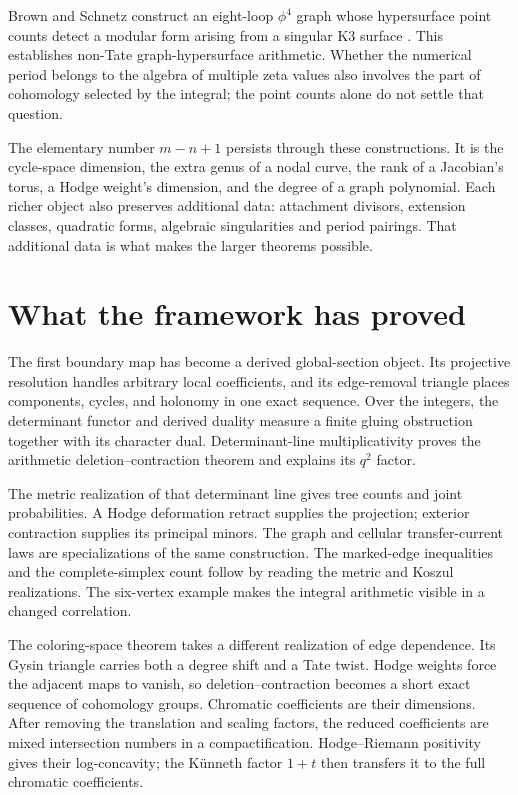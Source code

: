 \documentclass[11pt]{article}
\theoremstyle{definition}
\theoremstyle{remark}
\begin{document}
Brown and Schnetz construct an eight-loop $\phi^4$ graph whose hypersurface point counts detect a modular form arising from a singular K3 surface \cite{BrownSchnetzKThree}. This establishes non-Tate graph-hypersurface arithmetic. Whether the numerical period belongs to the algebra of multiple zeta values also involves the part of cohomology selected by the integral; the point counts alone do not settle that question.

The elementary number $m-n+1$ persists through these constructions.  It
is the cycle-space dimension, the extra genus of a nodal curve, the rank
of a Jacobian's torus, a Hodge weight's dimension, and the degree of a
graph polynomial.  Each richer object also preserves additional data:
attachment divisors, extension classes, quadratic forms, algebraic
singularities and period pairings.  That additional data is what makes
the larger theorems possible.


\section{What the framework has proved}
\label{sec:conclusion}

The first boundary map has become a derived global-section object. Its projective resolution handles arbitrary local coefficients, and its edge-removal triangle places components, cycles, and holonomy in one exact sequence. Over the integers, the determinant functor and derived duality measure a finite gluing obstruction together with its character dual. Determinant-line multiplicativity proves the arithmetic deletion--contraction theorem and explains its $q^2$ factor.

The metric realization of that determinant line gives tree counts and joint probabilities. A Hodge deformation retract supplies the projection; exterior contraction supplies its principal minors. The graph and cellular transfer-current laws are specializations of the same construction. The marked-edge inequalities and the complete-simplex count follow by reading the metric and Koszul realizations. The six-vertex example makes the integral arithmetic visible in a changed correlation.

The coloring-space theorem takes a different realization of edge dependence. Its Gysin triangle carries both a degree shift and a Tate twist. Hodge weights force the adjacent maps to vanish, so deletion--contraction becomes a short exact sequence of cohomology groups. Chromatic coefficients are their dimensions. After removing the translation and scaling factors, the reduced coefficients are mixed intersection numbers in a compactification. Hodge--Riemann positivity gives their log-concavity; the Künneth factor $1+t$ then transfers it to the full chromatic coefficients.
\end{document}
